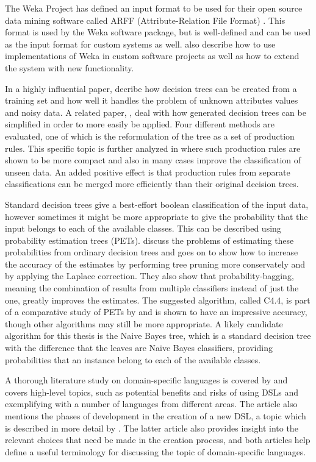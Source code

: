 \documentclass[10pt,twocolumn]{article}
\begin{document}
The Weka Project has defined an input format to be used for their open source data mining software called ARFF (Attribute-Relation File Format) \citep{Garner1995, Witten2011}. This format is used by the Weka software package, but is well-defined and can be used as the input format for custom systems as well. \citet{Witten2011} also describe how to use implementations of Weka in custom software projects as well as how to extend the system with new functionality.

In a highly influential paper, \citet{Quinlan1986} decribe how decision trees can be created from a training set and how well it handles the problem of unknown attributes values and noisy data. A related paper, \citet{Quinlan1987}, deal with how generated decision trees can be simplified in order to more easily be applied. Four different methods are evaluated, one of which is the reformulation of the tree as a set of production rules. This specific topic is further analyzed in \citet{Quinlan1987b} where such production rules are shown to be more compact and also in many cases improve the classification of unseen data. An added positive effect is that production rules from separate classifications can be merged more efficiently than their original decision trees.

Standard decision trees give a best-effort boolean classification of the input data, however sometimes it might be more appropriate to give the probability that the input belongs to each of the available classes. This can be described using probability estimation trees (PETs). \citet{Provost2003} discuss the problems of estimating these probabilities from ordinary decision trees and goes on to show how to increase the accuracy of the estimates by performing tree pruning more conservately and by applying the Laplace correction. They also show that probability-bagging, meaning the combination of results from multiple classifiers instead of just the one, greatly improves the estimates. The suggested algorithm, called C4.4, is part of a comparative study of PETs by \citet{Chu2011} and is shown to have an impressive accuracy, though other algorithms may still be more appropriate. A likely candidate algorithm for this thesis is the Naive Bayes tree, which is a standard decision tree with the difference that the leaves are Naive Bayes classifiers, providing probabilities that an instance belong to each of the available classes.

A thorough literature study on domain-specific languages is covered by \citet{Deursen2000} and covers high-level topics, such as potential benefits and risks of using DSLs and exemplifying with a number of languages from different areas. The article also mentions the phases of development in the creation of a new DSL, a topic which is described in more detail by \citet{Mernik2005}. The latter article also provides insight into the relevant choices that need be made in the creation process, and both articles help define a useful terminology for discussing the topic of domain-specific languages.
\end{document}
